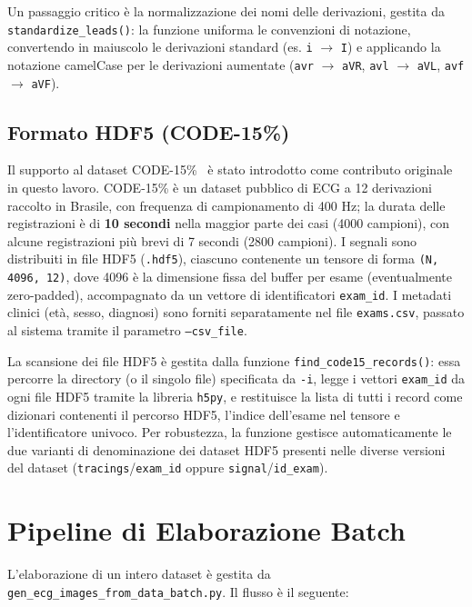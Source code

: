 Un passaggio critico è la normalizzazione dei nomi delle derivazioni, gestita da \texttt{standardize\_leads()}: la funzione uniforma le convenzioni di notazione, convertendo in maiuscolo le derivazioni standard (es. \texttt{i} $\rightarrow$ \texttt{I}) e applicando la notazione camelCase per le derivazioni aumentate (\texttt{avr} $\rightarrow$ \texttt{aVR}, \texttt{avl} $\rightarrow$ \texttt{aVL}, \texttt{avf} $\rightarrow$ \texttt{aVF}).

\subsection{Formato HDF5 (CODE-15\%)}

Il supporto al dataset CODE-15\%~\cite{ribeiro_2021_4916206} è stato introdotto come contributo originale in questo lavoro. CODE-15\% è un dataset pubblico di ECG a 12 derivazioni raccolto in Brasile, con frequenza di campionamento di 400 Hz; la durata delle registrazioni è di \textbf{10 secondi} nella maggior parte dei casi (4000 campioni), con alcune registrazioni più brevi di 7 secondi (2800 campioni). I segnali sono distribuiti in file HDF5 (\texttt{.hdf5}), ciascuno contenente un tensore di forma \texttt{(N, 4096, 12)}, dove 4096 è la dimensione fissa del buffer per esame (eventualmente zero-padded), accompagnato da un vettore di identificatori \texttt{exam\_id}. I metadati clinici (età, sesso, diagnosi) sono forniti separatamente nel file \texttt{exams.csv}, passato al sistema tramite il parametro \texttt{--csv\_file}.

La scansione dei file HDF5 è gestita dalla funzione \texttt{find\_code15\_records()}: essa percorre la directory (o il singolo file) specificata da \texttt{-i}, legge i vettori \texttt{exam\_id} da ogni file HDF5 tramite la libreria \texttt{h5py}, e restituisce la lista di tutti i record come dizionari contenenti il percorso HDF5, l'indice dell'esame nel tensore e l'identificatore univoco. Per robustezza, la funzione gestisce automaticamente le due varianti di denominazione dei dataset HDF5 presenti nelle diverse versioni del dataset (\texttt{tracings}/\texttt{exam\_id} oppure \texttt{signal}/\texttt{id\_exam}).

\section{Pipeline di Elaborazione Batch}\label{sec:batch}

L'elaborazione di un intero dataset è gestita da \texttt{gen\_ecg\_images\_\allowbreak{}from\_data\_\allowbreak{}batch.py}. Il flusso è il seguente:

